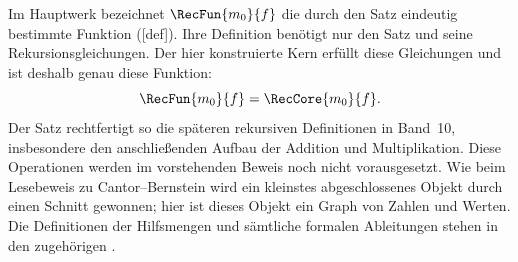 Im Hauptwerk bezeichnet \(\RecFun{m_0}{f}\) die durch den Satz
eindeutig bestimmte Funktion
([def]). Ihre Definition benötigt nur
den Satz und seine Rekursionsgleichungen. Der hier konstruierte Kern
erfüllt diese Gleichungen und ist deshalb genau diese Funktion:
\[
  \RecFun{m_0}{f}=\RecCore{m_0}{f}.
\]
Der Satz rechtfertigt so die späteren rekursiven Definitionen in
Band~10, insbesondere den anschließenden Aufbau der Addition und
Multiplikation. Diese Operationen werden im vorstehenden Beweis
noch nicht vorausgesetzt. Wie beim Lesebeweis zu Cantor--Bernstein
wird ein kleinstes abgeschlossenes Objekt durch einen Schnitt
gewonnen; hier ist dieses Objekt ein Graph von Zahlen und Werten.
Die Definitionen der Hilfsmengen und sämtliche formalen
Ableitungen stehen in den zugehörigen \DedekindProofsLink{}.
